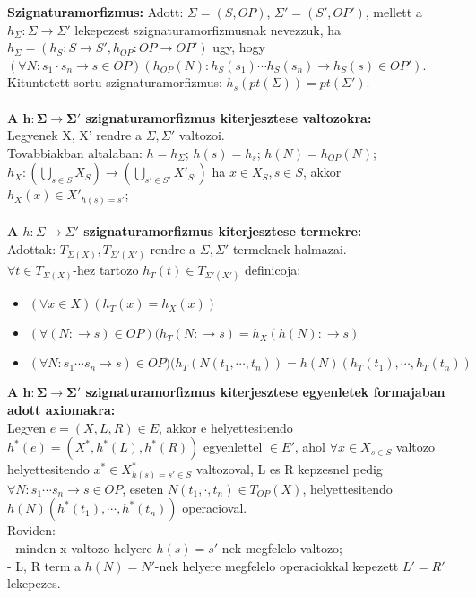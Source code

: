 \documentclass[a4paper,10pt]{article}
\begin{document}
\textbf{Szignaturamorfizmus:} Adott: $\Sigma=(S,OP)$, $\Sigma'=(S',OP')$, mellett a  $h_\Sigma:\Sigma\to \Sigma'$ lekepezest szignaturamorfizmusnak nevezzuk, ha $h_\Sigma=(h_S:S\to S', h_{OP}: OP\to OP')$ ugy, hogy $(\forall N: s_1 \cdot s_n \to s \in OP)(h_{OP}(N):h_S(s_1)\cdots h_S(s_n)\to h_S(s) \in OP')$.\\
Kituntetett sortu szignaturamorfizmus: $h_s(pt(\Sigma)) = pt(\Sigma')$.\\ \\
\textbf{A $\mathbf{h: \Sigma \to \Sigma'}$ szignaturamorfizmus kiterjesztese valtozokra:}\\
Legyenek X, X' rendre a $\Sigma, \Sigma'$ valtozoi.\\
Tovabbiakban altalaban: $h=h_{\Sigma}$; $h(s)=h_s$; $h(N) = h_{OP}(N)$;\\
$h_X:(\bigcup_{s \in S} X_S) \to (\bigcup_{s' \in S'} X'_{S'})$
ha $x\in X_S, s \in S$, akkor $h_X(x) \in X'_{h(s)=s'}$;\\ \\
\textbf{A $h: \Sigma \to \Sigma'$ szignaturamorfizmus kiterjesztese termekre:}\\
Adottak: $T_{\Sigma(X)}, T_{\Sigma'(X')}$ rendre a $\Sigma, \Sigma'$ termeknek halmazai.\\
$\forall t\in T_{\Sigma(X)}$-hez tartozo $h_T(t)\in T_{\Sigma'(X')}$ definicoja:
\begin{itemize}
\item $(\forall x\in X)(h_T(x)=h_X(x))$
\item $(\forall(N:\to s)\in OP)(h_T(N:\to s)=h_X(h(N):\to s)$
\item $(\forall N:s_1\cdots s_n\to s)\in OP)(h_T(N(t_1, \cdots, t_n)) = h(N)(h_T(t_1), \cdots, h_T(t_n))$
\end{itemize}
\textbf{A $\mathbf{h:\Sigma\to \Sigma'}$ szignaturamorfizmus kiterjesztese egyenletek formajaban adott axiomakra:}\\
Legyen $e=(X, L, R) \in E$, akkor e helyettesitendo $h^*(e)=(X^*, h^*(L), h^*(R))$ egyenlettel $\in E'$, ahol $\forall x \in X_{s\in S}$ valtozo helyettesitendo $x^*\in X^*_{h(s)=s'\in S}$ valtozoval, L es R kepzesnel pedig $\forall N:s_1 \cdots s_n \to s \in OP$, eseten $N(t_1, \cdot, t_n) \in T_{OP}(X)$,
helyettesitendo $h(N)(h^*(t_1), \cdots, h^*(t_n))$ operacioval.\\
Roviden:\\
- minden x valtozo helyere $h(s) = s'$-nek megfelelo valtozo;\\
- L, R term a $h(N) = N'$-nek helyere megfelelo operaciokkal kepezett $L'=R'$ lekepezes.\\ \\
\end{document}
